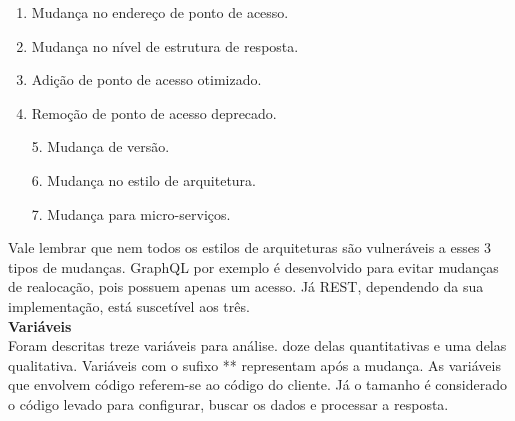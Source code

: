 \begin{description}[leftmargin=8em,style=nextline]
  \item[\textbf{Realocação}] 
  \begin{enumerate}
  \item Mudança no endereço de ponto de acesso.
  \item Mudança no nível de estrutura de resposta.
  \item Adição de ponto de acesso otimizado.
  \item Remoção de ponto de acesso deprecado.
  \end{enumerate}
  \item[\textbf{Transição}] 
  \begin{enumerate}
  \item[5.] Mudança de versão.
  \item[6.] Mudança no estilo de arquitetura.
  \end{enumerate}
  \item[\textbf{Composição}]
  \begin{enumerate}
  \item[7.] Mudança para micro-serviços.
  \end{enumerate}
\end{description}

Vale lembrar que nem todos os estilos de arquiteturas são vulneráveis a esses 3 tipos de mudanças. GraphQL por exemplo é desenvolvido para evitar mudanças de realocação, pois possuem apenas um acesso. Já REST, dependendo da sua implementação, está suscetível aos três. \\

\textbf{Variáveis} \\

Foram descritas treze variáveis para análise. doze delas quantitativas e uma delas qualitativa. Variáveis com o sufixo ** representam após a mudança. As variáveis que envolvem código referem-se ao código do cliente. Já o tamanho é considerado o código levado para configurar, buscar os dados e processar a resposta.

